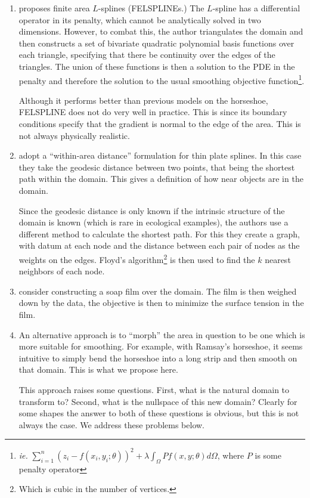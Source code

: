 \documentclass[a4paper,10pt]{amsart}
\begin{document}
\begin{enumerate}
\item \cite{ramsay} proposes finite area $L$-splines (FELSPLINEs.) The $L$-spline has a differential operator in its penalty, which cannot be analytically solved in two dimensions. However, to combat this, the author triangulates the domain and then constructs a set of bivariate quadratic polynomial basis functions over each triangle, specifying that there be continuity over the edges of the triangles. The union of these functions is then a solution to the PDE in the penalty and therefore the solution to the usual smoothing objective function\footnote{\emph{ie.} $\sum_{i=1}^n (z_i-f(x_i,y_i;\theta))^2 + \lambda \int_\Omega Pf(x,y;\theta)d\Omega$, where $P$  is some penalty operator}.

Although it performs better than previous models on the horseshoe, FELSPLINE does not do very well in practice. This is since its boundary conditions specify that the gradient is normal to the edge of the area. This is not always physically realistic.

\item \cite{wangranalli} adopt a ``within-area distance'' formulation for thin plate splines. In this case they take the geodesic distance between two points, that being the shortest path within the domain. This gives a definition of how near objects are in the domain.

Since the geodesic distance is only known if the intrinsic structure of the domain is known (which is rare in ecological examples), the authors use a different method to calculate the shortest path. For this they create a graph, with datum at each node and the distance between each pair of nodes as the weights on the edges. Floyd's algorithm\footnote{Which is cubic in the number of vertices.} is then used to find the $k$ nearest neighbors of each node.


\item \cite{soap} consider constructing a soap film over the domain. The film is then weighed down by the data, the objective is then to minimize the surface tension in the film.

\item An alternative approach is to ``morph'' the area in question to be one which is more suitable for smoothing. For example, with Ramsay's horseshoe, it seems intuitive to simply bend the horseshoe into a long strip and then smooth on that domain. This is what we propose here. 

This approach raises some questions. First, what is the natural domain to transform to? Second, what is the nullspace of this new domain? Clearly for some shapes the answer to both of these questions is obvious, but this is not always the case. We address these problems below.


\end{enumerate}
\end{document}
